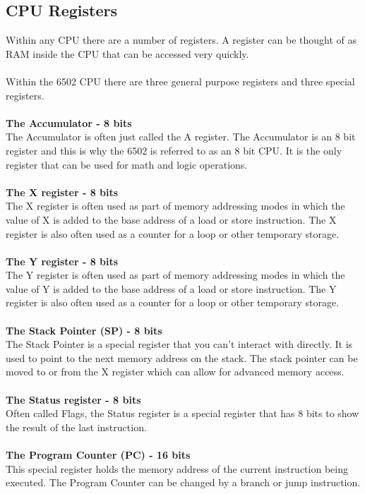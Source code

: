 \documentclass{ol-softwaremanual}
\begin{document}
\subsection{CPU Registers}
Within any CPU there are a number of registers. A register can be thought of as RAM inside the CPU that can be accessed very quickly.\\
\\
Within the 6502 CPU there are three general purpose registers and three special registers.\\
\\
\textbf{The Accumulator - 8 bits}\\
The Accumulator is often just called the A register. The Accumulator is an 8 bit register and this is why the 6502 is referred to as an 8 bit CPU. It is the only register that can be used for math and logic operations.\\
\\
\textbf{The X register - 8 bits}\\
The X register is often used as part of memory addressing modes in which the value of X is added to the base address of a load or store instruction. The X register is also often used as a counter for a loop or other temporary storage.\\
\\
\textbf{The Y register - 8 bits}\\
The Y register is often used as part of memory addressing modes in which the value of Y is added to the base address of a load or store instruction. The Y register is also often used as a counter for a loop or other temporary storage.\\
\\
\textbf{The Stack Pointer (SP) - 8 bits}\\
The Stack Pointer is a special register that you can't interact with directly. It is used to point to the next memory address on the stack. The stack pointer can be moved to or from the X register which can allow for advanced memory access.\\
\\
\textbf{The Status register - 8 bits}\\
Often called Flags, the Status register is a special register that has 8 bits to show the result of the last instruction.\\
\\
\textbf{The Program Counter (PC) -  16 bits}\\
This special register holds the memory address of the current instruction being executed. The Program Counter can be changed by a branch or jump instruction.\\ 
\\
\end{document}
